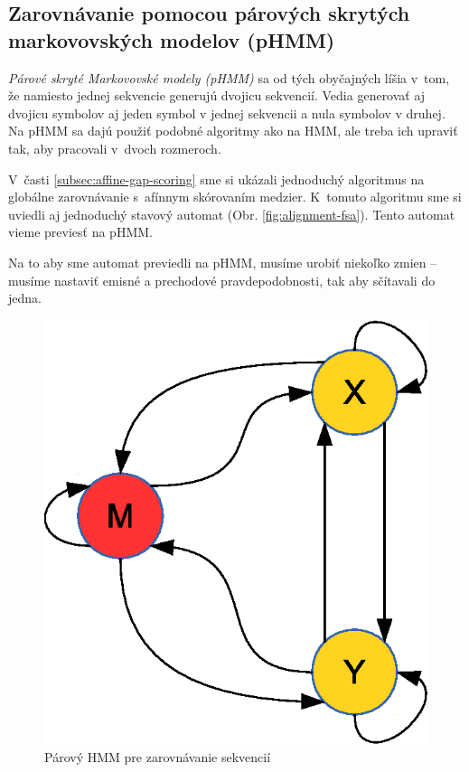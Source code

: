


\subsection{Zarovnávanie pomocou párových skrytých markovovských modelov (pHMM)}
\label{subsec:hmm-alignment}

\textit{Párové skryté Markovovské modely (pHMM)} sa od tých obyčajných líšia v~tom, že namiesto jednej sekvencie generujú dvojicu sekvencií. Vedia generovať aj dvojicu symbolov aj jeden symbol v jednej sekvencii a nula symbolov v druhej. Na pHMM sa dajú použiť podobné algoritmy ako na HMM, ale treba ich upraviť tak, aby pracovali v~dvoch rozmeroch.

V~časti \ref{subsec:affine-gap-scoring} sme si ukázali jednoduchý algoritmus na globálne zarovnávanie s~afínnym skórovaním medzier. K~tomuto algoritmu sme si uviedli aj jednoduchý stavový automat (Obr. \ref{fig:alignment-fsa}). Tento automat vieme previesť na pHMM.

Na to aby sme automat previedli na pHMM, musíme urobiť niekoľko zmien -- musíme nastaviť emisné a prechodové pravdepodobnosti, tak aby sčítavali do jedna.\cite{durbin}

\begin{figure}[htp]
    \centering
    \includegraphics[width=.4\textwidth]{images/simple_model}
    \caption{Párový HMM pre zarovnávanie sekvencií}
    \label{fig:simple-model}
\end{figure}

